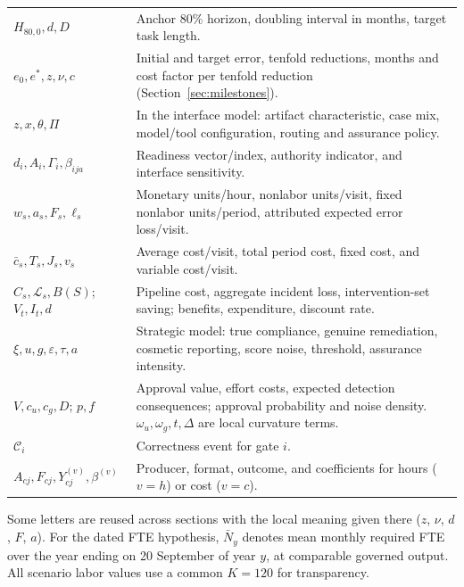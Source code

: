 \begin{tabularx}{\linewidth}{@{}P{3.7cm}L@{}}
$H_{80,0},d,D$ & Anchor 80\% horizon, doubling interval in months, target task length.\\
$e_0,e^{*},z,\nu,c$ & Initial and target error, tenfold reductions, months and cost factor per tenfold reduction (Section~\ref{sec:milestones}).\\
$z,x,\theta,\Pi$ & In the interface model: artifact characteristic, case mix, model/tool configuration, routing and assurance policy.\\
$d_i,A_i,\Gamma_i,\beta_{ija}$ & Readiness vector/index, authority indicator, and interface sensitivity.\\
$w_s,a_s,F_s,\ell_s$ & Monetary units/hour, nonlabor units/visit, fixed nonlabor units/period, attributed expected error loss/visit.\\
$\bar c_s,T_s,J_s,v_s$ & Average cost/visit, total period cost, fixed cost, and variable cost/visit.\\
$C_s,\mathcal{L}_s,B(S)$; $V_t,I_t,d$ & Pipeline cost, aggregate incident loss, intervention-set saving; benefits, expenditure, discount rate.\\
$\xi,u,g,\varepsilon,\tau,a$ & Strategic model: true compliance, genuine remediation, cosmetic reporting, score noise, threshold, assurance intensity.\\
$V,c_u,c_g,D$; $p,f$ & Approval value, effort costs, expected detection consequences; approval probability and noise density. $\omega_u,\omega_g,t,\Delta$ are local curvature terms.\\
$\mathcal{C}_i$ & Correctness event for gate $i$.\\
$A_{cj},F_{cj},Y^{(v)}_{cj},\beta^{(v)}$ & Producer, format, outcome, and coefficients for hours ($v=h$) or cost ($v=c$).\\
\bottomrule
\end{tabularx}
\endgroup

Some letters are reused across sections with the local meaning given there ($z$, $\nu$, $d$, $F$, $a$).
For the dated FTE hypothesis, $\bar N_y$ denotes mean monthly required FTE over the year ending
on 20 September of year $y$, at comparable governed output.
All scenario labor values use a common $K=120$ for transparency.
